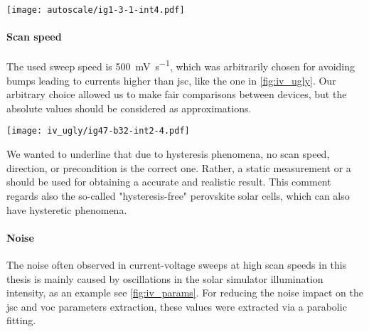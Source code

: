 \begin{SCfigure}%
	\centering
	\texttt{[image: autoscale/ig1-3-1-int4.pdf]}
	\label{fig:autoscale}
\end{SCfigure}

\paragraph{Scan speed} The used sweep speed is \SI{500}{\mV\per\s}, which was arbitrarily chosen for avoiding bumps leading to currents higher than \gls{jsc}, like the one in \cref{fig:iv_ugly}. %
Our arbitrary choice allowed us to make fair comparisons between devices, but the absolute values should be considered as approximations.
\begin{SCfigure}%
	\centering
	\texttt{[image: iv\_ugly/ig47-b32-int2-4.pdf]}
	\label{fig:iv_ugly}
\end{SCfigure}
We wanted to underline that due to hysteresis phenomena, no scan speed, direction, or precondition is the correct one.  %
Rather, a static measurement or a  should be used for obtaining a accurate and realistic result.
This comment regards also the so-called "hysteresis-free" perovskite solar cells, which can also have hysteretic phenomena\cite{Jacobs2018}. 

\paragraph{Noise} The noise often observed in current-voltage sweeps at high scan speeds in this thesis is mainly caused by oscillations in the solar simulator illumination intensity, as an example see \cref{fig:iv_params}. For reducing the noise impact on the \gls{jsc} and \gls{voc} parameters extraction, these values were extracted via a parabolic fitting. %


